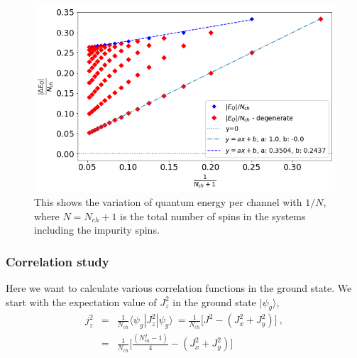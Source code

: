 \documentclass[reprint,prb,superscriptaddress]{revtex4-1}
\begin{document}
\begin{figure}[!h]
\centering
\includegraphics[scale=0.34]{plt/Quantum_Energy_per_channel}
\caption{This shows the variation of quantum energy per channel with $1/N$, where $N=N_{ch}+1$ is the total number of spins in the systems including the impurity spins. }
\end{figure}


\subsubsection{Correlation study}
Here we want to calculate various correlation functions in the ground state. We start with the expectation value of $J_z^2$ in the ground state $|\psi_g\rangle$,
\begin{eqnarray}
j_z^2&=&\frac{1}{N_{ch}}\langle \psi_g | J_z^2 | \psi_g \rangle~=\frac{1}{N_{ch}} \bigg[ J^2-(J_x^2+J_y^2) \bigg] ~,\nonumber\\
&=& \frac{1}{N_{ch}} \bigg[ \frac{(N_{ch}^2-1)}{4}-(J_x^2+J_y^2) \bigg]
\end{eqnarray}
\end{document}
